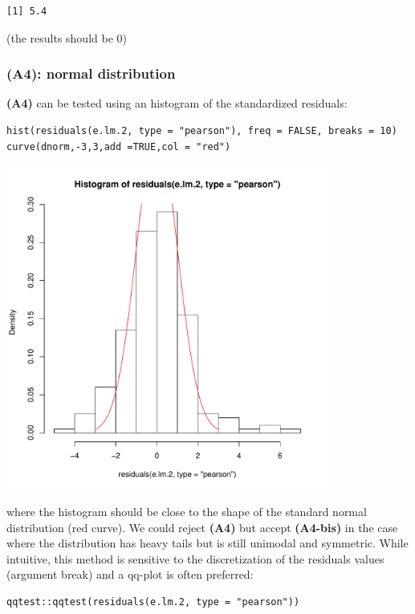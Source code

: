 \documentclass[12pt]{article}
\begin{document}
\begin{verbatim}
[1] 5.4
\end{verbatim}
(the results should be 0)

\subsubsection{\textbf{(A4)}: normal distribution}
\label{sec:org49be381}

\textbf{(A4)} can be tested using an histogram of the standardized residuals:
\lstset{language=r,label= ,caption= ,captionpos=b,numbers=none}
\begin{lstlisting}
hist(residuals(e.lm.2, type = "pearson"), freq = FALSE, breaks = 10)
curve(dnorm,-3,3,add =TRUE,col = "red")
\end{lstlisting}

\begin{center}
\includegraphics[width=0.8\textwidth]{./figures/A4-hist-res.pdf}
\end{center}

where the histogram should be close to the shape of the standard
normal distribution (red curve). We could reject \textbf{(A4)} but accept
\textbf{(A4-bis)} in the case where the distribution has heavy tails but is
still unimodal and symmetric. While intuitive, this method is
sensitive to the discretization of the residuals values (argument
break) and a qq-plot is often preferred:
\lstset{language=r,label= ,caption= ,captionpos=b,numbers=none}
\begin{lstlisting}
qqtest::qqtest(residuals(e.lm.2, type = "pearson"))
\end{lstlisting}
\end{document}
